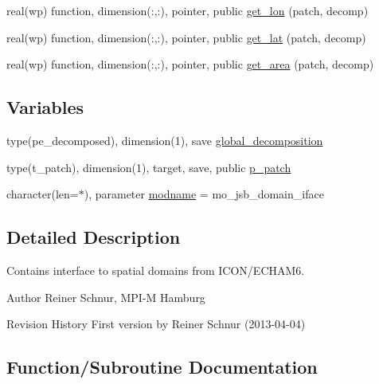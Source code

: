 \begin{DoxyCompactItemize}
\item 
real(wp) function, dimension(\+:,\+:), pointer, public \hyperlink{namespacemo__jsb__domain__iface_a026b4e63e8ae775bc1621cc37da5da2b}{get\+\_\+lon} (patch, decomp)
\item 
real(wp) function, dimension(\+:,\+:), pointer, public \hyperlink{namespacemo__jsb__domain__iface_a3d9e98bf333fe59aa4108a37ed0947d3}{get\+\_\+lat} (patch, decomp)
\item 
real(wp) function, dimension(\+:,\+:), pointer, public \hyperlink{namespacemo__jsb__domain__iface_af469456668d8bdb4619e492296338af7}{get\+\_\+area} (patch, decomp)
\end{DoxyCompactItemize}
\subsection*{Variables}
\begin{DoxyCompactItemize}
\item 
type(pe\+\_\+decomposed), dimension(1), save \hyperlink{namespacemo__jsb__domain__iface_af4a20b2bcbe28bcb3a12e209c85fa762}{global\+\_\+decomposition}
\item 
type(t\+\_\+patch), dimension(1), target, save, public \hyperlink{namespacemo__jsb__domain__iface_a0afd1d2a27a8d25a8e915997494b19ed}{p\+\_\+patch}
\item 
character(len=$\ast$), parameter \hyperlink{namespacemo__jsb__domain__iface_af1037ce2c7c80ed94354f71e9a8f33d0}{modname} = \textquotesingle{}mo\+\_\+jsb\+\_\+domain\+\_\+iface\textquotesingle{}
\end{DoxyCompactItemize}


\subsection{Detailed Description}
Contains interface to spatial domains from I\+C\+O\+N/\+E\+C\+H\+A\+M6. 

\begin{DoxyAuthor}{Author}
Reiner Schnur, M\+P\+I-\/\+M Hamburg
\end{DoxyAuthor}
\begin{DoxyParagraph}{Revision History}
First version by Reiner Schnur (2013-\/04-\/04) 
\end{DoxyParagraph}


\subsection{Function/\+Subroutine Documentation}
\hypertarget{namespacemo__jsb__domain__iface_af469456668d8bdb4619e492296338af7}{}
